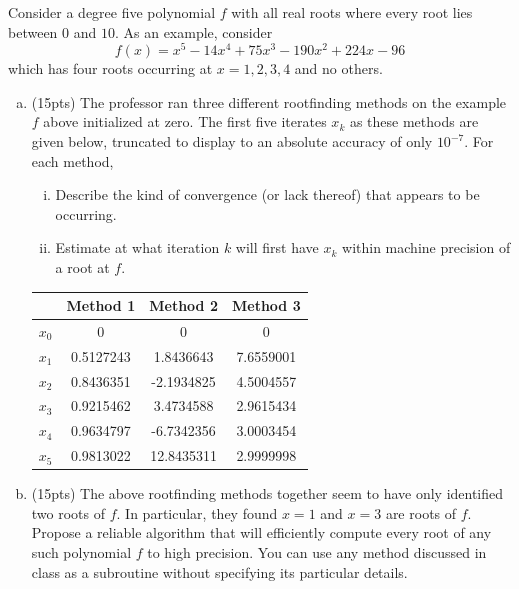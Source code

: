 \documentclass[11pt]{article}
\newenvironment{problem}[2][Q]{\begin{trivlist}
\item[\hskip \labelsep {\bfseries #1}{\bfseries #2}]}{\end{trivlist}}
\theoremstyle{definition}
\begin{document}
\begin{problem}{4. (Polynomial Rootfinding, 30pts)}
Consider a degree five polynomial $f$ with all real roots where every root lies between $0$ and $10$. As an example, consider $$f(x) = x^5 - 14x^4 + 75x^3 - 190x^2 + 224x - 96$$ which has four roots occurring at $x = 1, 2, 3, 4$ and no others.
\begin{enumerate}[(a)]
    \item (15pts) The professor ran three different rootfinding methods on the example $f$ above initialized at zero. The first five iterates $x_k$ as these methods are given below, truncated to display to an absolute accuracy of only $10^{-7}$. For each method,
    \begin{enumerate}[(i)]
        \item Describe the kind of convergence (or lack thereof) that appears to be occurring.
        \item Estimate at what iteration $k$ will first have $x_k$ within machine precision of a root at $f$.
    \end{enumerate}
    \begin{tabular}{c|c|c|c}
        & Method 1 & Method 2 & Method 3 \\\hline
        $x_0$ & 0 & 0 & 0 \\
        $x_1$ & 0.5127243 & 1.8436643 & 7.6559001 \\
        $x_2$ & 0.8436351 & -2.1934825 & 4.5004557 \\
        $x_3$ & 0.9215462 & 3.4734588 & 2.9615434 \\
        $x_4$ & 0.9634797 & -6.7342356 & 3.0003454 \\
        $x_5$ & 0.9813022 & 12.8435311 & 2.9999998
    \end{tabular}
    \item (15pts) The above rootfinding methods together seem to have only identified two roots of $f$. In particular, they found $x = 1$ and $x = 3$ are roots of $f$. Propose a reliable algorithm that will efficiently compute every root of any such polynomial $f$ to high precision. You can use any method discussed in class as a subroutine without specifying its particular details.
\end{enumerate}
\end{problem}
\end{document}
